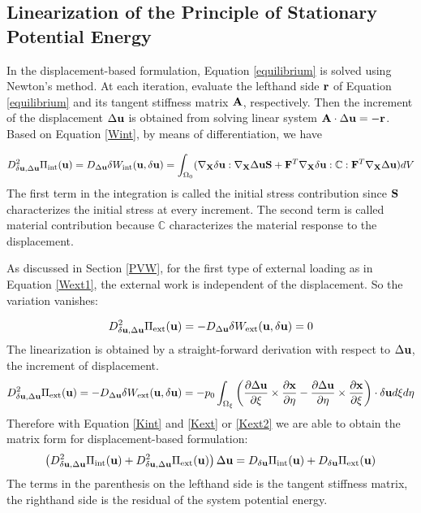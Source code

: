 %
\subsection{Linearization of the Principle of Stationary Potential Energy}
In the displacement-based formulation, Equation \ref{equilibrium} is solved using Newton's method. At each iteration, evaluate the lefthand side $\bold{r}$ of Equation \ref{equilibrium} and its tangent stiffness matrix $\bold{A}$, respectively. Then the increment of the displacement $\Delta\bold{u}$ is obtained from solving linear system $\bold{A} \cdot \Delta\bold{u} = -\bold{r}$. Based on Equation \ref{Wint}, by means of differentiation, we have

\begin{equation} \label{Kint}
D^2_{\delta\bold{u}, \Delta\bold{u}}\Pi_\mathrm{int}(\bold{u}) = D_{\Delta{\bold{u}}}\delta{W_\mathrm{int}}(\bold{u}, \delta{\bold{u}}) = \int_{\Omega_0}(\nabla_{\bold{X}}\delta\bold{u} : \nabla_{\bold{X}}\Delta\bold{u}\bold{S} + \bold{F}^T\nabla_{\bold{X}}\delta{\bold{u}} : \mathbb{C} : \bold{F}^T \nabla_{\bold{X}}\Delta\bold{u})dV
\end{equation}
The first term in the integration is called the initial stress contribution since $\bold{S}$ characterizes the initial stress at every increment. The second term is called material contribution because $\mathbb{C}$ characterizes the material response to the displacement.

As discussed in Section \ref{PVW}, for the first type of external loading as in Equation \ref{Wext1}, the external work is independent of the displacement. So the variation vanishes:

\begin{equation} \label{Kext}
D^2_{\delta\bold{u}, \Delta\bold{u}}\Pi_\mathrm{ext}(\bold{u}) = - D_{\Delta{\bold{u}}}\delta{W_\mathrm{ext}}(\bold{u}, \delta{\bold{u}}) = 0
\end{equation}
The linearization is obtained by a straight-forward derivation with respect to $\Delta\bold{u}$, the increment of displacement. 
\begin{equation}  \label{Kext2}
D^2_{\delta\bold{u}, \Delta\bold{u}}\Pi_\mathrm{ext}(\bold{u}) = - D_{\Delta{\bold{u}}}\delta{W_\mathrm{ext}}(\bold{u}, \delta{\bold{u}}) = - p_0\int_{\Omega_{\xi}}  \left(\frac{\partial \Delta\bold{u}}{\partial{\xi}} \times
\frac{\partial\bold{x}}{\partial\eta} - \frac{\partial \Delta\bold{u}}{\partial{\eta}} \times
\frac{\partial\bold{x}}{\partial\xi}    \right) \cdot \delta{\bold{u}} d\xi d\eta
\end{equation}
Therefore with Equation \ref{Kint} and \ref{Kext} or \ref{Kext2} we are able to obtain the matrix form for displacement-based formulation:
\begin{equation} \label{matrix}
\left( D^2_{\delta\bold{u}, \Delta\bold{u}}\Pi_\mathrm{int}(\bold{u}) + D^2_{\delta\bold{u}, \Delta\bold{u}}\Pi_\mathrm{ext}(\bold{u})  \right) \Delta\bold{u} = D_{\delta\bold{u}}\Pi_\mathrm{int}(\bold{u}) + D_{\delta\bold{u}}\Pi_\mathrm{ext}(\bold{u})
\end{equation}
The terms in the parenthesis on the lefthand side is the tangent stiffness matrix, the righthand side is the residual of the system potential energy.

